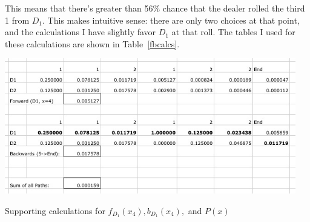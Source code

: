 \documentclass[12pt]{article}
\begin{document}
This means that there's greater than 56\% chance that the dealer rolled the third 1 from $D_1$.  This makes intuitive sense: there are only two choices at that point, and the calculations I have slightly favor $D_1$ at that roll.  The tables I used for these calculations are shown in Table~\ref{fbcalcs}.

\begin{table}[hbt]
	\begin{center}
		\includegraphics[width=5in]{fbcalcs.jpg}
	\end{center}
	\caption{Supporting calculations for $f_{D_1}(x_4),b_{D_1}(x_4),$ and $P(x)$ }
	\label{fbcalcs}
\end{table}
\end{document}
